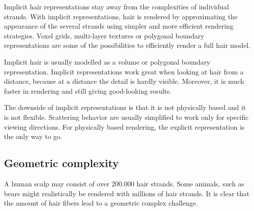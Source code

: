 \documentclass[11pt,a4paper]{report}
\begin{document}
Implicit hair representations stay away from the complexities of individual strands. With implicit representations, hair is rendered by approximating the appearance of the several strands using simpler and more efficient rendering strategies. Voxel grids, multi-layer textures or polygonal boundary representations are some of the possibilities to efficiently render a full hair model.

Implicit hair is usually modelled as a volume or polygonal boundary representation. Implicit representations work great when looking at hair from a distance, because at a distance the detail is hardly visible. Moreover, it is much faster in rendering and still giving good-looking results.









The downside of implicit representations is that it is not physically based and it is not flexible. Scattering behavior are usually simplified to work only for specific viewing directions. For physically based rendering, the explicit representation is the only way to go.

\subsection{Geometric complexity}
\label{sec_geometric_complexity}

A human scalp may consist of over 200.000 hair strands. Some animals, such as bears might realistically be rendered with millions of hair strands. It is clear that the amount of hair fibers lead to a geometric complex challenge. 
\end{document}
